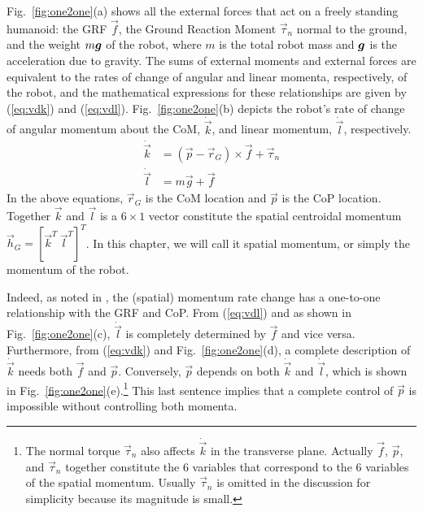 \documentclass{llncs}
\newcommand{\bg}{\mbox{\boldmath $g$}}
\newcommand{\vg}{\vec{g}}
\newcommand{\vp}{\vec{p}}
\newcommand{\vk}{\vec{k}}
\newcommand{\vr}{\vec{r}}
\newcommand{\vtau}{\vec{\tau}}
\newcommand{\vf}{\vec{f}}
\newcommand{\vh}{\vec{h}}
\newcommand{\vdk} {\dot{\vec{k}}}
\newcommand{\vl}{\vec{l}}
\newcommand{\vdl} {\dot{\vec{l}}}
\begin{document}
Fig.~\ref{fig:one2one}(a) shows all the external forces that act on a freely
standing humanoid: the GRF $\vf$, the Ground Reaction Moment
$\vtau_n$ normal to the ground, and the weight $m\bg$ of the robot,
where $m$ is the total robot mass and $\bg$ is the acceleration due to gravity. The
sums of external moments and external forces are equivalent to the rates of change of angular and linear momenta, respectively, of the robot, and the mathematical expressions for these relationships are given by (\ref{eq:vdk}) and (\ref{eq:vdl}). Fig.~\ref{fig:one2one}(b) depicts the robot's
 rate of change of angular momentum about the CoM, $\vdk$, and linear momentum, $\vdl$, respectively.
\begin{align}
	\vdk &= (\vp - \vr_G)\times\vf + \vtau_n \label{eq:vdk}\\
	\vdl &= m\vg + \vf \label{eq:vdl}	
\end{align}
In the above equations, $\vr_G$ is the CoM location and $\vp$ is the CoP location.
Together $\vk$ and $\vl$ is a $6\times 1$ vector constitute the spatial centroidal momentum
$\vh_G=[\vk^T~\vl^T]^T$.
In this chapter, we will call it spatial momentum, or simply the momentum of the robot. 

Indeed, as noted in \cite{Macchietto09}, the (spatial) momentum
rate change has a one-to-one relationship with the GRF and CoP.
From (\ref{eq:vdl}) and as shown in Fig.~\ref{fig:one2one}(c), $\vdl$ is completely determined by
$\vf$ and vice versa. Furthermore, from (\ref{eq:vdk}) and Fig.~\ref{fig:one2one}(d), a complete
description of $\vdk$ needs both $\vf$ and
$\vp$. Conversely, $\vp$ depends on both $\vdk$ and $\vdl$,  which is shown in Fig.~\ref{fig:one2one}(e).\footnote{The normal torque $\vtau_n$ also affects $\vdk$ in the
transverse plane. Actually $\vf$, $\vp$, and $\vtau_n$ together
constitute the 6 variables that correspond to the 6 variables of the spatial momentum.
Usually $\vtau_n$ is omitted in the discussion for simplicity
because its magnitude is small.}
This last sentence implies that a complete control of $\vp$ is impossible
without controlling both momenta.%
\end{document}
